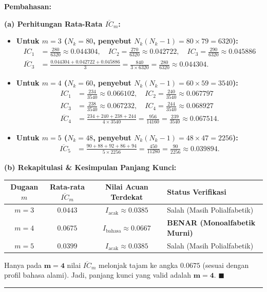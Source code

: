 \documentclass[11pt,a4paper]{article}
\newenvironment{solusi}{\noindent\textbf{\textsf{Pembahasan:}}\par\vspace{0.2em}}{\hfill$\blacksquare$\vspace{1em}\par\hrule\vspace{1em}}
\begin{document}
\begin{solusi}
\textbf{(a) Perhitungan Rata-Rata $\overline{IC}_m$:}
\begin{itemize}[leftmargin=*]
    \item \textbf{Untuk $m = 3$ ($N_k = 80$, penyebut $N_k(N_k - 1) = 80 \times 79 = 6320$):}
    \begin{align*}
    IC_1 &= \frac{280}{6320} \approx 0.044304, \quad IC_2 = \frac{270}{6320} \approx 0.042722, \quad IC_3 = \frac{290}{6320} \approx 0.045886 \\
    \overline{IC}_3 &= \frac{0.044304 + 0.042722 + 0.045886}{3} = \frac{840}{3 \times 6320} = \frac{280}{6320} \approx \mathbf{0.044304}.
    \end{align*}
    
    \item \textbf{Untuk $m = 4$ ($N_k = 60$, penyebut $N_k(N_k - 1) = 60 \times 59 = 3540$):}
    \begin{align*}
    IC_1 &= \frac{234}{3540} \approx 0.066102, \quad IC_2 = \frac{240}{3540} \approx 0.067797 \\
    IC_3 &= \frac{238}{3540} \approx 0.067232, \quad IC_4 = \frac{244}{3540} \approx 0.068927 \\
    \overline{IC}_4 &= \frac{234 + 240 + 238 + 244}{4 \times 3540} = \frac{956}{14160} = \frac{239}{3540} \approx \mathbf{0.067514}.
    \end{align*}
    
    \item \textbf{Untuk $m = 5$ ($N_k = 48$, penyebut $N_k(N_k - 1) = 48 \times 47 = 2256$):}
    \begin{align*}
    \overline{IC}_5 &= \frac{90 + 88 + 92 + 86 + 94}{5 \times 2256} = \frac{450}{11280} = \frac{90}{2256} \approx \mathbf{0.039894}.
    \end{align*}
\end{itemize}

\vspace{0.2cm}
\textbf{(b) Rekapitulasi \& Kesimpulan Panjang Kunci:}
\begin{center}
\begin{tabular}{c c c l}
\toprule
\textbf{Dugaan $m$} & \textbf{Rata-rata $\overline{IC}_m$} & \textbf{Nilai Acuan Terdekat} & \textbf{Status Verifikasi} \\
\midrule
$m = 3$ & $0.0443$ & $I_{\text{acak}} \approx 0.0385$ & Salah (Masih Polialfabetik) \\
\textbf{$m = 4$} & \textbf{$0.0675$} & \textbf{$I_{\text{bahasa}} \approx 0.0667$} & \textbf{BENAR (Monoalfabetik Murni)} \\
$m = 5$ & $0.0399$ & $I_{\text{acak}} \approx 0.0385$ & Salah (Masih Polialfabetik) \\
\bottomrule
\end{tabular}
\end{center}
Hanya pada $\mathbf{m = 4}$ nilai $\overline{IC}_m$ melonjak tajam ke angka $0.0675$ (sesuai dengan profil bahasa alami). Jadi, panjang kunci yang valid adalah $\mathbf{m = 4}$.
\end{solusi}
\end{document}
